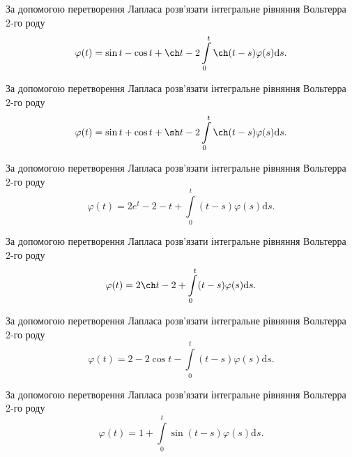 \documentclass[12pt]{extarticle}
\begin{document}
\begin{Exercise}
За допомогою перетворення Лапласа розв’язати інтегральне рівняння Вольтерра 2-го роду \[\varphi(t) = \sin t - \cos t + \ch t - 2\int\limits_{0}^{t} \ch (t-s) \varphi(s) \mathrm{d}s.\]
\end{Exercise}

\begin{Exercise}
За допомогою перетворення Лапласа розв’язати інтегральне рівняння Вольтерра 2-го роду \[\varphi(t) = \sin t + \cos t + \sh t - 2\int\limits_{0}^{t} \ch (t-s) \varphi(s) \mathrm{d}s.\]
\end{Exercise}

\begin{Exercise}
За допомогою перетворення Лапласа розв’язати інтегральне рівняння Вольтерра 2-го роду \[\varphi(t) = 2 e^t - 2 - t + \int\limits_{0}^{t} (t - s) \varphi(s) \mathrm{d}s.\]
\end{Exercise}

\begin{Exercise}
За допомогою перетворення Лапласа розв’язати інтегральне рівняння Вольтерра 2-го роду \[\varphi(t) = 2 \ch t - 2 + \int\limits_{0}^{t} (t - s) \varphi(s) \mathrm{d}s.\]
\end{Exercise}

\begin{Exercise}
За допомогою перетворення Лапласа розв’язати інтегральне рівняння Вольтерра 2-го роду \[\varphi(t) = 2 - 2\cos t - \int\limits_{0}^{t} (t - s) \varphi(s) \mathrm{d}s.\]
\end{Exercise}

\begin{Exercise}
За допомогою перетворення Лапласа розв’язати інтегральне рівняння Вольтерра 2-го роду \[\varphi(t) = 1 + \int\limits_{0}^{t} \sin (t - s) \varphi(s) \mathrm{d}s.\]
\end{Exercise}
\end{document}
